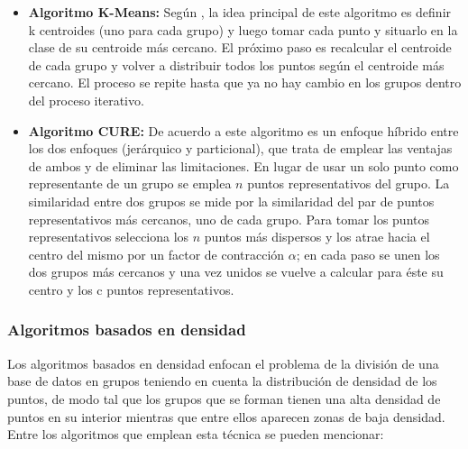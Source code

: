 \begin{itemize} 
 \item \textbf{Algoritmo K-Means: } Según \cite{[DUHASTO]}, la idea principal de este algoritmo es definir k centroides (uno para cada grupo) y luego tomar cada punto y situarlo en la clase de su centroide más cercano. El próximo paso es recalcular el centroide de cada grupo y volver a distribuir todos los puntos según el centroide más cercano. El proceso se repite hasta que ya no hay cambio en los grupos dentro del proceso iterativo.
 \item \textbf{Algoritmo CURE: }De acuerdo a \cite{[GURASHI]} este algoritmo es un enfoque híbrido entre los dos enfoques (jerárquico y particional), que trata de emplear las ventajas de ambos y de eliminar las limitaciones. En lugar de usar un solo punto como representante de un grupo se emplea $n$ puntos representativos del grupo. La similaridad entre dos grupos se mide por la similaridad del par de puntos representativos más cercanos, uno de cada grupo.
Para tomar los puntos representativos selecciona los $n$ puntos más dispersos y los atrae hacia el centro del mismo por un factor de contracción ${\alpha }$; en cada paso se unen los dos grupos más cercanos y una vez unidos se vuelve a calcular para éste su centro y los c puntos representativos.
\end{itemize}
 
\subsubsection {Algoritmos basados en densidad}
Los algoritmos basados en densidad enfocan el problema de la división de una base de datos en grupos teniendo en cuenta la distribución de densidad de los puntos, de modo tal que los grupos que se forman tienen una alta densidad de puntos en su interior mientras que entre ellos aparecen zonas de baja densidad. Entre los algoritmos que emplean esta técnica se pueden mencionar:
 
